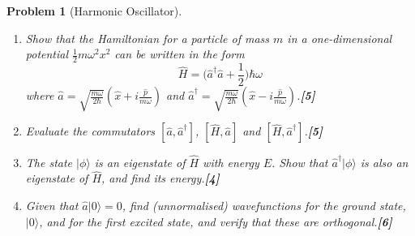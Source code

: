 \documentclass[a4paper]{article}
\theoremstyle{new}
\newtheorem{qns}{Problem}[subsection]
\begin{document}
\newpage
\begin{qns}[Harmonic Oscillator]\leavevmode
\begin{enumerate}[label=(\roman*)]
\item Show that the Hamiltonian for a particle of mass $m$ in a one-dimensional potential $\frac{1}{2}m\omega^2x^2$ can be written in the form 
$$\hat{H}=\bigg(\hat{a}^\dag\hat{a}+\frac{1}{2}\bigg)\hbar\omega$$
where $\hat{a}=\sqrt{\frac{m\omega}{2\hbar}}(\hat{x}+i\frac{\hat{p}}{m\omega})$ and $\hat{a}^\dag=\sqrt{\frac{m\omega}{2\hbar}}(\hat{x}-i\frac{\hat{p}}{m\omega})$.\hfill\textbf{[5]}
\item Evaluate the commutators $[\hat{a},\hat{a}^\dag]$, $[\hat{H},\hat{a}]$ and $[\hat{H},\hat{a}^\dag]$.\hfill\textbf{[5]}
\item The state $|\phi\rangle$ is an eigenstate of $\hat{H}$ with energy $E$. Show that $\hat{a}^\dag|\phi\rangle$ is also an
eigenstate of $\hat{H}$, and find its energy.\hfill\textbf{[4]}
\item Given that $\hat{a}|0\rangle=0$, find (unnormalised) wavefunctions for the ground state, $|0\rangle$, and for the first excited state, and verify that these are orthogonal.\hfill\textbf{[6]}
\end{enumerate}
\end{qns}
\end{document}
